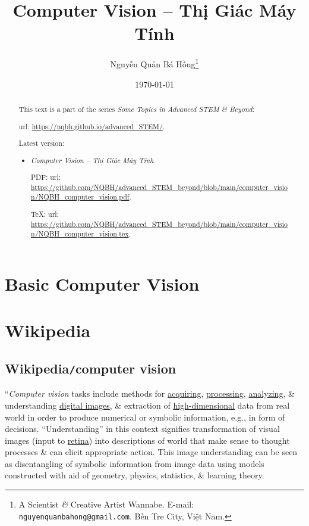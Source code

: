 \documentclass{article}
\title{Computer Vision -- Thị Giác Máy Tính}
\author{Nguyễn Quản Bá Hồng\footnote{A Scientist {\it\&} Creative Artist Wannabe. E-mail: {\tt nguyenquanbahong@gmail.com}. Bến Tre City, Việt Nam.}}
\date{\today}
\begin{document}
\maketitle
\begin{abstract}
	This text is a part of the series {\it Some Topics in Advanced STEM \& Beyond}:
	
	{\sc url}: \url{https://nqbh.github.io/advanced_STEM/}.
	
	Latest version:
	\begin{itemize}
		\item {\it Computer Vision -- Thị Giác Máy Tính}.
		
		PDF: {\sc url}: \url{https://github.com/NQBH/advanced_STEM_beyond/blob/main/computer_vision/NQBH_computer_vision.pdf}.
		
		\TeX: {\sc url}: \url{https://github.com/NQBH/advanced_STEM_beyond/blob/main/computer_vision/NQBH_computer_vision.tex}.
	\end{itemize}
\end{abstract}
\tableofcontents


\section{Basic Computer Vision}


\section{Wikipedia}

\subsection{Wikipedia{\tt/}computer vision}
``{\it Computer vision} tasks include methods for \href{https://en.wikipedia.org/wiki/Image_sensor}{acquiring}, \href{https://en.wikipedia.org/wiki/Image_processing}{processing}, \href{https://en.wikipedia.org/wiki/Image_analysis}{analyzing}, \& understanding \href{https://en.wikipedia.org/wiki/Digital_image}{digital images}, \& extraction of \href{https://en.wikipedia.org/wiki/High-dimensional}{high-dimensional} data from real world in order to produce numerical or symbolic information, e.g., in form of decisions. ``Understanding'' in this context signifies transformation of visual images (input to \href{https://en.wikipedia.org/wiki/Retina}{retina}) into descriptions of world that make sense to thought processes \& can elicit appropriate action. This image understanding can be seen as disentangling of symbolic information from image data using models constructed with aid of geometry, physics, statistics, \& learning theory.
\end{document}
